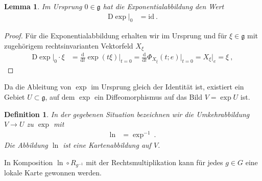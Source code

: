 \documentclass[10pt,a4paper]{article}
\theoremstyle{mytheorem}
\newtheorem{lemma}[theorem]{Lemma}
\theoremstyle{mydefinition}
\newtheorem{definition}[theorem]{Definition}
\newcommand{\dt}{\mathrm{d}}
\newcommand{\Dt}{\mathrm{D}}
\newcommand{\fg}{\mathfrak{g}}
\begin{document}
\begin{lemma}
\label{th:DExp0}
Im Ursprung $0\in\fg$ hat die Exponentialabbildung den Wert
\begin{align*}
	\Dt\exp|_0
	&=
	\mathrm{id}
	\ .
\end{align*}
\end{lemma}
\begin{proof}
Für die Exponentialabbildung erhalten wir im Ursprung und für $\xi\in\fg$ mit zugehörigem rechtsinvarianten Vektorfeld $X_\xi$
\begin{align*}
	\Dt\exp|_0 \cdot\xi
	&=
	\frac{\dt}{\dt t}
		\exp(t\xi)
	\Big|_{t=0}
	= \frac{\dt}{\dt t}
		\Phi_{X_{\xi}}(t;e)
	\Big|_{t=0}
	= X_\xi|_e = \xi
	\ ,
\end{align*}
\end{proof}

Da die Ableitung von $\exp$ im Ursprung gleich der Identität ist,
existiert ein Gebiet $U\subset\mathfrak{g}$, auf dem $\exp$ ein Diffeomorphismus auf das Bild $V=\exp U$ ist.

\begin{definition}
In der gegebenen Situation bezeichnen wir die Umkehrabbildung $V\rightarrow U$ zu $\exp$ mit
\begin{align*}
	\ln &= \exp^{-1}
	\ .
\end{align*}
Die Abbildung $\ln$ ist eine Kartenabbildung auf $V$.
\end{definition}
In Komposition $\ln\circ R_{g^{-1}}$ mit der Rechtsmultiplikation kann für jedes $g\in G$ eine lokale Karte gewonnen werden.
\end{document}
